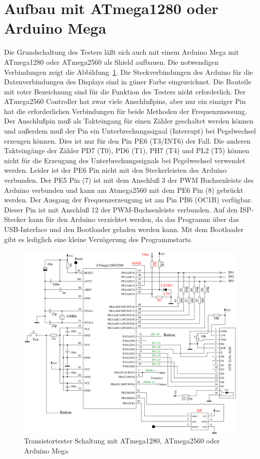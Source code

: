 \section{Aufbau mit ATmega1280 oder Arduino Mega}
Die Grundschaltung des Testers läßt sich auch mit einem Arduino Mega mit ATmega1280 oder
ATmega2560 als Shield aufbauen.
Die notwendigen Verbindungen zeigt die Abbildung~\ref{fig:t1280tester}.
Die Steckverbindungen des Arduino für die Datenverbindungen des Displays sind in güner Farbe eingezeichnet.
Die Bauteile mit roter Bezeichnung sind für die Funktion des Testers nicht erforderlich.
Der ATmega2560 Controller hat zwar viele Anschlußpins, aber nur ein einziger Pin hat die
erforderlichen Verbindungen für beide Methoden der Frequenzmessung.
Der Anschlußpin muß als Takteingang für einen Zähler geschaltet werden können und außerdem muß
der Pin ein Unterbrechungssignal (Interrupt) bei Pegelwechsel erzeugen können.
Dies ist nur für den Pin PE6 (T3/INT6) der Fall. Die anderen Takteingänge der Zähler
PD7 (T0), PD6 (T1), PH7 (T4) und PL2 (T5) können nicht für die Erzeugung des Unterbrechungssignals
bei Pegelwechsel verwendet werden.
Leider ist der PE6 Pin nicht mit den Steckerleisten des Arduino verbunden.
Der PE5 Pin (7) ist mit dem Anschluß 3 der PWM Buchsenleiste des Arduino verbunden und kann
am Atmega2560 mit dem PE6 Pin (8) gebrückt werden.
Der Ausgang der Frequenzerzeugung ist am Pin PB6 (OC1B) verfügbar. Dieser Pin ist mit Anschluß 12
der PWM-Buchsenleiste verbunden.
Auf den ISP-Stecker kann für den Arduino verzichtet werden, da das Programm über
das USB-Interface und den Bootloader geladen werden kann.  Mit dem
Bootloader gibt es lediglich eine kleine Verzögerung des Programmstarts.

\begin{figure}[H]
\centering
\includegraphics[width=1.\textwidth]{../FIG/t1280tester.pdf}	%
\caption{Transistortester Schaltung mit ATmega1280, ATmega2560 oder Arduino Mega}
\label{fig:t1280tester}
\end{figure}

